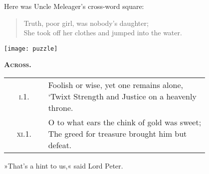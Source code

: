 \vfill

Here was Uncle Meleager's cross-word square:

\begin{quote}
Truth, poor girl, was nobody's daughter;\\
She took off her clothes and jumped into the water.\\
\end{quote}

\begin{center}
\texttt{[image: puzzle]}
\end{center}

\pagebreak[2]

{\scshape\large\bfseries Across.}

\def\arraystretch{2.5}
	
\begin{longtable} {c p{0.8\linewidth}} 
\textsc{i.1.} & \makecell[l]{Foolish or wise, yet one remains alone,\\`Twixt Strength and Justice on a heavenly throne.}\\
\textsc{xi.1.} & \makecell[l]{O to what ears the chink of gold was sweet;\\
The greed for treasure brought him but defeat.}\\
\end{longtable}

»That's a hint to us,« said Lord Peter.

